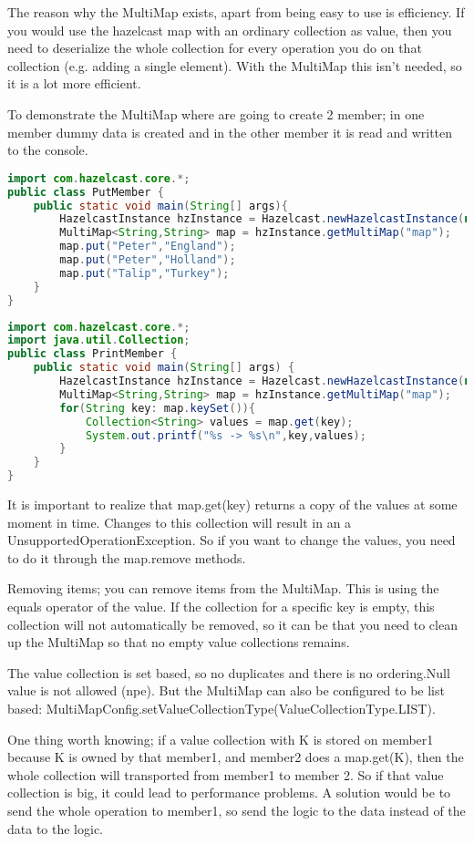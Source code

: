 The reason why the MultiMap exists, apart from being easy to use is efficiency. If you would use the hazelcast map with an ordinary collection as value, then you need to deserialize the whole collection for every operation you do on that collection (e.g. adding a single element). With the MultiMap this isn't needed, so it is a lot more efficient.

To demonstrate the MultiMap where are going to create 2 member; in one member dummy data is created and in the other member it is read and written to the console.
\begin{lstlisting}[language=java]
import com.hazelcast.core.*;
public class PutMember {
    public static void main(String[] args){
        HazelcastInstance hzInstance = Hazelcast.newHazelcastInstance(null);
        MultiMap<String,String> map = hzInstance.getMultiMap("map");
        map.put("Peter","England");
        map.put("Peter","Holland");
        map.put("Talip","Turkey");
    }
}
\end{lstlisting}

\begin{lstlisting}[language=java]
import com.hazelcast.core.*;
import java.util.Collection;
public class PrintMember {
    public static void main(String[] args) {
        HazelcastInstance hzInstance = Hazelcast.newHazelcastInstance(null);
        MultiMap<String,String> map = hzInstance.getMultiMap("map");
        for(String key: map.keySet()){
            Collection<String> values = map.get(key);
            System.out.printf("%s -> %s\n",key,values);
        }
    }
}
\end{lstlisting}
It is important to realize that map.get(key) returns a copy of the values at some moment in time. Changes to this collection will result in an a UnsupportedOperationException. So if you want to change the values, you need to do it through the map.remove methods.

Removing items; you can remove items from the MultiMap. This is using the equals operator of the value. If the collection for a specific key is empty, this collection will not automatically be removed, so it can be that you need to clean up the MultiMap so that no empty value collections remains.

The value collection is set based, so no duplicates and there is no ordering.Null value is not allowed (npe). But the MultiMap can also be configured to be list based: MultiMapConfig.setValueCollectionType(ValueCollectionType.LIST). 

One thing worth knowing; if a value collection with K is stored on member1 because K is owned by that member1, and member2 does a map.get(K), then the whole collection will transported from member1 to member 2. So if that value collection is big, it could lead to performance problems. A solution would be to send the whole operation to member1, so send the logic to the data instead of the data to the logic.

